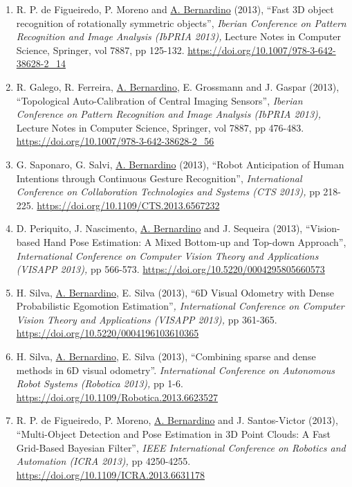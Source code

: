 \documentclass[
]{article}
\begin{document}
\begin{enumerate}
{  (IbPRIA 2013),} Lecture Notes in Computer Science, Springer, vol 7887,
  pp 286-295. \url{https://doi.org/10.1007/978-3-642-38628-2_34}~
\item
  R. P. de Figueiredo, P. Moreno and \ul{A. Bernardino} (2013), ``Fast
  3D object recognition of rotationally symmetric objects'',
  \emph{Iberian Conference on Pattern Recognition and Image Analysis
  (IbPRIA 2013),} Lecture Notes in Computer Science, Springer, vol 7887,
  pp 125-132. \url{https://doi.org/10.1007/978-3-642-38628-2_14}~
\item
  R. Galego, R. Ferreira, \ul{A. Bernardino}, E. Grossmann and J. Gaspar
  (2013), ``Topological Auto-Calibration of Central Imaging Sensors'',
  \emph{Iberian Conference on Pattern Recognition and Image Analysis
  (IbPRIA 2013),} Lecture Notes in Computer Science, Springer, vol 7887,
  pp 476-483. \url{https://doi.org/10.1007/978-3-642-38628-2_56}~
\item
  G. Saponaro, G. Salvi, \ul{A. Bernardino} (2013), ``Robot Anticipation
  of Human Intentions through Continuous Gesture Recognition'',
  \emph{International Conference on Collaboration Technologies and
  Systems (CTS 2013),} pp 218-225.
  \url{https://doi.org/10.1109/CTS.2013.6567232}~
\item
  D. Periquito, J. Nascimento, \ul{A. Bernardino} and J. Sequeira
  (2013), ``Vision-based Hand Pose Estimation: A Mixed Bottom-up and
  Top-down Approach'', \emph{International Conference on Computer Vision
  Theory and Applications (VISAPP 2013),} pp 566-573.
  \url{https://doi.org/10.5220/0004295805660573}~
\item
  H. Silva, \ul{A. Bernardino}, E. Silva (2013), ``6D Visual Odometry
  with Dense Probabilistic Egomotion Estimation''\emph{, International
  Conference on Computer Vision Theory and Applications (VISAPP 2013),}
  pp 361-365. \url{https://doi.org/10.5220/0004196103610365}~
\item
  H. Silva, \ul{A. Bernardino}, E. Silva (2013), ``Combining sparse and
  dense methods in 6D visual odometry''. \emph{International Conference
  on Autonomous Robot Systems (Robotica 2013),} pp 1-6.
  \url{https://doi.org/10.1109/Robotica.2013.6623527}~
\item
  R. P. de Figueiredo, P. Moreno, \ul{A. Bernardino} and J.
  Santos-Victor (2013), ``Multi-Object Detection and Pose Estimation in
  3D Point Clouds: A Fast Grid-Based Bayesian Filter'', \emph{IEEE
  International Conference on Robotics and Automation (ICRA 2013),} pp
  4250-4255. \url{https://doi.org/10.1109/ICRA.2013.6631178}~~~

\end{enumerate}
\end{document}
